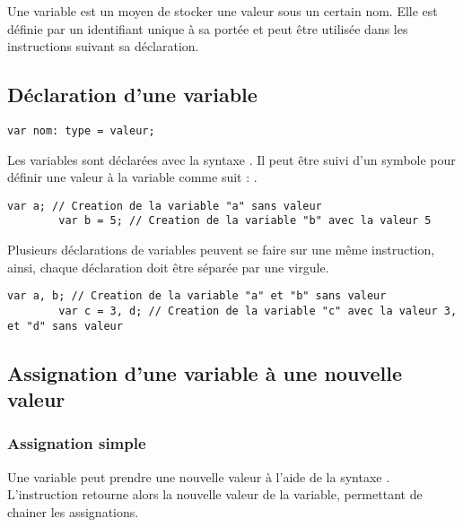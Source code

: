 \documentclass[../userguide.tex]{subfiles}
\begin{document}
    Une variable est un moyen de stocker une valeur sous un certain nom.
    Elle est définie par un identifiant unique à sa portée et peut être utilisée dans les instructions suivant
    sa déclaration.

    \subsection{Déclaration d'une variable} \label{subsec:declaration-d'une-variable}
    \begin{lstlisting}[label=lst:var-syntaxe]
        var nom: type = valeur;
    \end{lstlisting}
    \divider

    Les variables sont déclarées avec la syntaxe .
    Il peut être suivi d'un symbole \code{=} pour définir une valeur à la variable comme suit :
    .
    \begin{lstlisting}[label={lst:var-ex-1}]
        var a; // Creation de la variable "a" sans valeur
        var b = 5; // Creation de la variable "b" avec la valeur 5
    \end{lstlisting}
    \parindent
    Plusieurs déclarations de variables peuvent se faire sur une même instruction, ainsi, chaque
    déclaration doit être séparée par une virgule.

    \begin{lstlisting}[label={lst:var-ex-2}]
        var a, b; // Creation de la variable "a" et "b" sans valeur
        var c = 3, d; // Creation de la variable "c" avec la valeur 3, et "d" sans valeur
    \end{lstlisting}

    \subsection{Assignation d'une variable à une nouvelle valeur} \label{subsec:definition-d'une-variable}
    \parindent

    \subsubsection{Assignation simple} \label{subsubsec:assignation-simple}
    \parindent

    Une variable peut prendre une nouvelle valeur à l'aide de la syntaxe . L'instruction
    retourne alors la nouvelle valeur de la variable, permettant de chainer les assignations.
\end{document}
